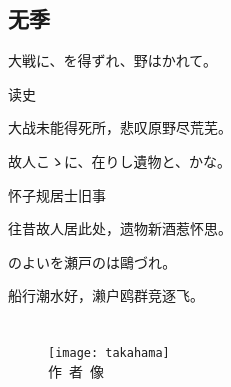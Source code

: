\section{\FK 无季}

\setcounter{haikucounter}{0}

\begin{haiku}
    {\FH 大戦に、を得ずれ、野はかれて。}

    {\FK 读史}

    {\FK 大战未能得死所，悲叹原野尽荒芜。}
\end{haiku}

\begin{haiku}
    {\FH 故人こゝに、在りし遺物と、かな。}

    {\FK 怀子规居士旧事}

    {\FK 往昔故人居此处，遗物新酒惹怀思。}
\end{haiku}

\begin{haiku}
    {\FH {}のよいを瀬戸のは鷗づれ。}

    {\FK 船行潮水好，濑户鸥群竞逐飞。}
\end{haiku}

\chapter[{\FM 高浜虚子}]{\FM {}}

\begin{center}
    \begin{figure}
        \centering
        \texttt{[image: takahama]}\\[1em]
        \large{\FS 作~者~像}
    \end{figure}
\end{center}

\newpage

